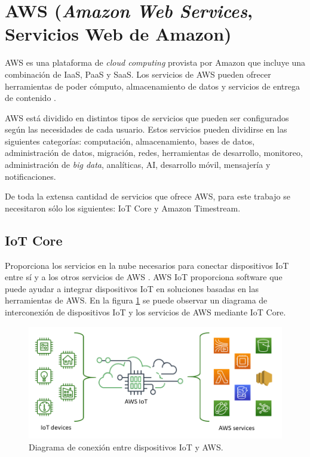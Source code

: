 \section{AWS (\textit{Amazon Web Services}, Servicios Web de Amazon)}
AWS es una plataforma de \textit{cloud computing} provista por Amazon que incluye una combinación de IaaS, PaaS y SaaS. Los servicios de AWS pueden ofrecer herramientas de poder cómputo, almacenamiento de datos y servicios de entrega de contenido \cite{aws_info}.

AWS está dividido en distintos tipos de servicios que pueden ser configurados según las necesidades de cada usuario. Estos servicios pueden dividirse en las siguientes categorías: computación, almacenamiento, bases de datos, administración de datos, migración, redes, herramientas de desarrollo, monitoreo, administración de \textit{big data}, analíticas, AI, desarrollo móvil, mensajería y notificaciones.

De toda la extensa cantidad de servicios que ofrece AWS, para este trabajo se necesitaron sólo los siguientes: IoT Core y Amazon Timestream.

\subsection{IoT Core}
Proporciona los servicios en la nube necesarios para conectar dispositivos IoT entre sí y a los otros servicios de AWS \cite{iot_info}. AWS IoT proporciona software que puede ayudar a integrar dispositivos IoT en soluciones basadas en las herramientas de AWS. En la figura \ref{fig:aws_iot} se puede observar un diagrama de interconexión de dispositivos IoT y los servicios de AWS mediante IoT Core.


\begin{figure}[h]
	\centering
	\includegraphics[scale=0.5]{./Figures/aws_iot.png}
	\caption{Diagrama de conexión entre dispositivos IoT y AWS\protect\footnotemark.}
	\label{fig:aws_iot}
\end{figure}

